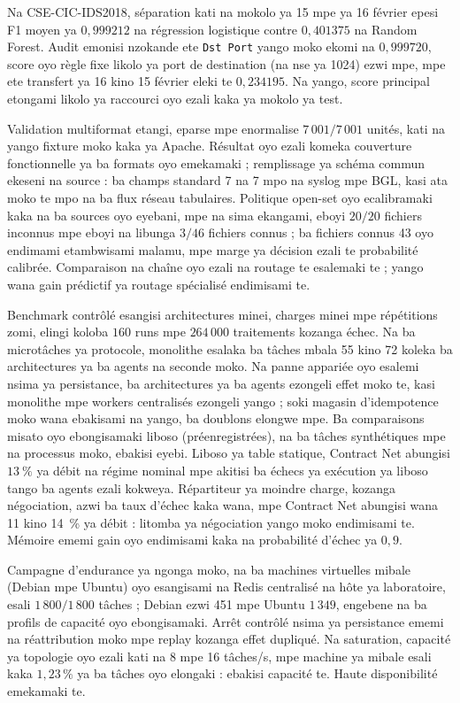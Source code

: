 Na CSE-CIC-IDS2018, séparation kati na mokolo ya 15 mpe ya 16 février
epesi F1 moyen ya $0{,}999212$ na régression logistique contre
$0{,}401375$ na Random Forest. Audit emonisi nzokande ete
\texttt{Dst Port} yango moko ekomi na $0{,}999720$, score oyo règle fixe
likolo ya port de destination (na nse ya 1024) ezwi mpe, mpe ete transfert
ya 16 kino 15 février eleki te $0{,}234195$. Na yango, score principal
etongami likolo ya raccourci oyo ezali kaka ya mokolo ya test.

Validation multiformat etangi, eparse mpe enormalise
$7\,001/7\,001$ unités, kati na yango fixture moko kaka ya Apache.
Résultat oyo ezali komeka couverture fonctionnelle ya ba formats oyo
emekamaki ; remplissage ya schéma commun ekeseni na source : ba champs
standard 7 na 7 mpo na syslog mpe BGL, kasi ata moko te mpo na ba flux
réseau tabulaires. Politique open-set oyo ecalibramaki
kaka na ba sources oyo eyebani, mpe na sima ekangami, eboyi $20/20$
fichiers inconnus mpe eboyi na libunga $3/46$ fichiers connus ; ba fichiers
connus 43 oyo endimami etambwisami malamu, mpe marge ya décision ezali te
probabilité calibrée. Comparaison na chaîne oyo ezali na routage te
esalemaki te ; yango wana gain prédictif ya routage spécialisé endimisami te.

Benchmark contrôlé esangisi architectures minei, charges minei mpe
répétitions zomi, elingi koloba $160$ runs mpe $264\,000$ traitements
kozanga échec. Na ba microtâches ya protocole, monolithe esalaka ba tâches mbala 55 kino 72 koleka ba architectures ya ba agents na seconde moko. Na panne
appariée oyo esalemi nsima ya persistance, ba architectures ya ba agents
ezongeli effet moko te, kasi monolithe mpe workers centralisés ezongeli
yango ; soki magasin d'idempotence moko wana ebakisami na yango, ba doublons elongwe mpe. Ba comparaisons misato oyo ebongisamaki liboso (préenregistrées), na ba tâches synthétiques mpe na processus moko, ebakisi eyebi. Liboso ya table statique, Contract Net abungisi $13~\%$ ya débit na régime nominal mpe akitisi ba échecs ya exécution ya liboso tango ba agents ezali kokweya. Répartiteur ya moindre charge, kozanga négociation, azwi ba taux d'échec kaka wana, mpe Contract Net abungisi wana 11 kino 14~\% ya débit : litomba ya négociation yango moko endimisami te. Mémoire ememi gain oyo endimisami kaka na probabilité d'échec ya $0{,}9$.

Campagne d'endurance ya ngonga moko, na ba machines virtuelles mibale
(Debian mpe Ubuntu) oyo esangisami na Redis centralisé na hôte ya
laboratoire, esali $1\,800/1\,800$ tâches ; Debian ezwi 451 mpe Ubuntu
$1\,349$, engebene na ba profils de capacité oyo ebongisamaki. Arrêt
contrôlé nsima ya persistance ememi na réattribution moko mpe replay
kozanga effet dupliqué. Na saturation, capacité ya topologie oyo ezali
kati na 8 mpe 16 tâches/s, mpe machine ya mibale esali kaka
$1{,}23\,\%$ ya ba tâches oyo elongaki : ebakisi capacité te. Haute
disponibilité emekamaki te.


